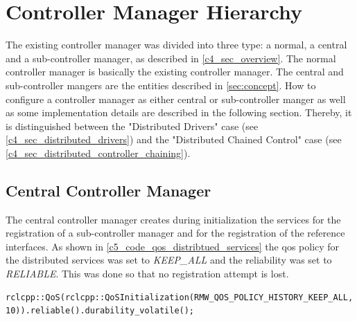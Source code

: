 \section{Controller Manager Hierarchy}
The existing controller manager was divided into three type: a normal, a central and a sub-controller manager, as described in \autoref{c4_sec_overview}. The normal controller manager is basically the existing controller manager. The central and sub-controller mangers are the entities described in \autoref{sec:concept}. How to configure a controller manager as either central or sub-controller manger as well as some implementation details are described in the following section. Thereby, it is distinguished between the "Distributed Drivers" case (see \autoref{c4_sec_distributed_drivers}) and the "Distributed Chained Control" case (see \autoref{c4_sec_distributed_controller_chaining}).

\subsection{Central Controller Manager}
The central controller manager creates during initialization the services for the registration of a sub-controller manager and for the registration of the reference interfaces. As shown in \autoref{c5_code_qos_distribtued_services} the \gls{qos} policy for the distributed services was set to \textit{KEEP\_ALL} and the reliability was set to \textit{RELIABLE}. This was done so that no registration attempt is lost. 
\lstset{language=C++,basicstyle=\small}
\begin{lstlisting}[caption=\gls{qos} for central controller manager's distributed services.,label=c5_code_qos_distribtued_services]
    rclcpp::QoS(rclcpp::QoSInitialization(RMW_QOS_POLICY_HISTORY_KEEP_ALL, 10)).reliable().durability_volatile();
\end{lstlisting}

